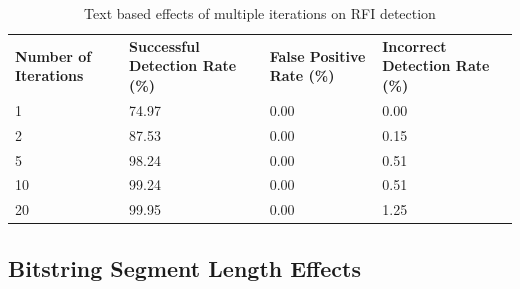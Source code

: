 \begin{appendices}
\begin{table}[h]
	\centering
	\begin{tabular}{|p{1.5in}|p{1in}|p{1in}|p{1in}|}
	\hline
	\textbf{Number of Iterations} & \textbf{Successful Detection Rate (\%)} & \textbf{False Positive Rate (\%)} & \textbf{Incorrect Detection Rate (\%)}  \\
	\hhline{|=|=|=|=|}
	1 & 74.97 & 0.00 & 0.00 \\
	\hline
	2 & 87.53 & 0.00 & 0.15 \\
	\hline
	5 & 98.24 & 0.00 & 0.51 \\
	\hline
	10 & 99.24 & 0.00 & 0.51 \\
	\hline
	20 & 99.95 & 0.00 & 1.25 \\
	\hline
	\end{tabular}
	\caption{Text based effects of multiple iterations on RFI detection}
\end{table}

\newpage
\subsection{Bitstring Segment Length Effects}


\end{appendices}
